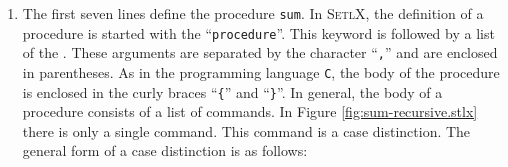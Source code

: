 \begin{enumerate}
\item The first seven lines define the procedure \texttt{sum}.  In \textsc{SetlX}, the definition of
      a procedure is started with the  ``\texttt{procedure}''.  This keyword is followed by
      a list of the .  These arguments are separated by the character ``\texttt{,}'' and
      are enclosed in parentheses.
      As in the programming language \texttt{C}, the body of the procedure is enclosed in the curly braces
      ``\texttt{\{}'' and ``\texttt{\}}''.  In general, the body of a procedure consists of a list
      of commands.  In Figure \ref{fig:sum-recursive.stlx} there is only a single command.  This
      command is a case distinction.  The general form of a case distinction is as follows:


\end{enumerate}
